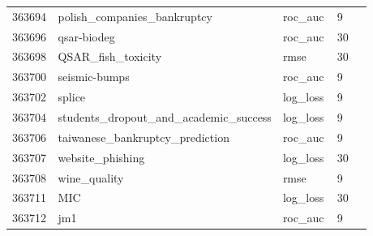 \begin{longtable}{@{}L{0.13\linewidth}L{0.43\linewidth}L{0.16\linewidth}N{0.16\linewidth}@{}}
363694 & polish\_companies\_bankruptcy & roc\_auc & 9\\
363696 & qsar-biodeg & roc\_auc & 30\\
363698 & QSAR\_fish\_toxicity & rmse & 30\\
363700 & seismic-bumps & roc\_auc & 9\\
363702 & splice & log\_loss & 9\\
363704 & students\_dropout\_and\_academic\_success & log\_loss & 9\\
363706 & taiwanese\_bankruptcy\_prediction & roc\_auc & 9\\
363707 & website\_phishing & log\_loss & 30\\
363708 & wine\_quality & rmse & 9\\
363711 & MIC & log\_loss & 30\\
363712 & jm1 & roc\_auc & 9\\
\bottomrule\end{longtable}
\endgroup
